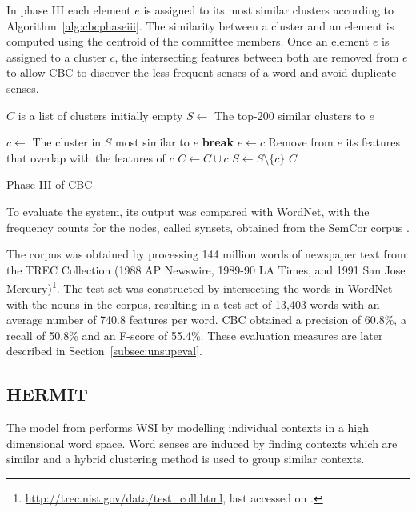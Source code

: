 In phase III each element $e$ is assigned to its most similar clusters
according to Algorithm~\ref{alg:cbcphaseiii}. The similarity between a cluster
and an element is computed using the centroid of the committee members. Once an
element $e$ is assigned to a cluster $c$, the intersecting features between
both are removed from $e$ to allow \ac{CBC} to discover the less frequent
senses of a word and avoid duplicate senses.

\begin{algorithm}
\begin{algorithmic}
\State $C$ is a list of clusters initially empty
  \State $S \gets$ The top-200 similar clusters to $e$

    \State $c \gets$ The cluster in $S$ most similar to $e$
      \State \textbf{break}
    \EndIf
     \State $e \gets c$
     \State Remove from $e$ its features that overlap with the features of $c$
     \State $C \gets C \cup c$
   \EndIf
   \State $S \gets S \setminus \{c\}$
  \EndWhile
  \State \Return $C$
\EndFunction
\end{algorithmic}
\caption{\label{alg:cbcphaseiii} Phase III of CBC}
\end{algorithm}

To evaluate the system, its output was compared with WordNet, with the
frequency counts for the nodes, called synsets, obtained from the SemCor corpus 
\citep{miller1993semantic}.

The corpus was obtained by processing 144 million words of newspaper text from 
the TREC Collection (1988 AP Newswire, 1989-90 LA Times, and 1991 San Jose 
Mercury)\footnote{\url{http://trec.nist.gov/data/test_coll.html}, last 
accessed on .}. The test set was constructed by 
intersecting the words in WordNet 
with the nouns in the corpus, resulting in a test set of 13,403 words with an 
average number of 740.8 features per word. \ac{CBC} obtained a precision of 
60.8\%, a recall of 50.8\% and an F-score of 55.4\%. These evaluation 
measures are later described in Section~\ref{subsec:unsupeval}.

\subsection{HERMIT}

The model from \citet{jurgens2010hermit} performs \ac{WSI} by modelling
individual contexts in a high dimensional word space. Word senses are induced 
by finding contexts which are similar and a hybrid clustering method is used to 
group similar contexts.

